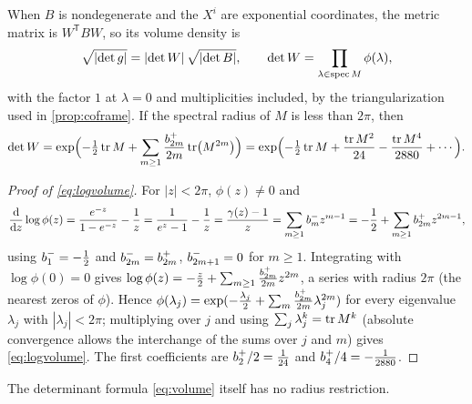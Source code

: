 When $B$ is nondegenerate and the $X^i$ are exponential coordinates, the
metric matrix is $W^{\mathsf T}BW$, so its volume density is
\begin{equation}\label{eq:volume}
 \sqrt{\left\lvert\det g\right\rvert}=\left\lvert\det W\right\rvert\sqrt{\left\lvert\det B\right\rvert},\qquad
 \det W=\prod_{\lambda\in\operatorname{spec} M}\phi(\lambda),
\end{equation}
with the factor $1$ at $\lambda=0$ and multiplicities included, by the
triangularization used in \cref{prop:coframe}. If the spectral radius of
$M$ is less than $2\pi$, then
\begin{equation}\label{eq:logvolume}
 \det W=\exp\Bigl(-\tfrac12\operatorname{tr} M+\sum_{m\geq1}\frac{b^{+}_{2m}}{2m}\operatorname{tr}\bigl(M^{2m}\bigr)\Bigr)
 =\exp\Bigl(-\tfrac12\operatorname{tr} M+\frac{\operatorname{tr} M^2}{24}-\frac{\operatorname{tr} M^4}{2880}+\cdots\Bigr).
\end{equation}
\begin{proof}[Proof of \eqref{eq:logvolume}]
For $|z|<2\pi$, $\phi(z)\neq0$ and
\[
 \frac{\mathrm{d}}{\mathrm{d} z}\log\phi(z)=\frac{e^{-z}}{1-e^{-z}}-\frac1z
 =\frac1{e^z-1}-\frac1z=\frac{\gamma(z)-1}{z}
 =\sum_{m\geq1}b^{-}_{m}z^{m-1}=-\frac12+\sum_{m\geq1}b^{+}_{2m}z^{2m-1},
\]
using $b^{-}_{1}=-\tfrac12$ and $b^{-}_{2m}=b^{+}_{2m}$, $b^{-}_{2m+1}=0$
for $m\geq1$. Integrating with $\log\phi(0)=0$ gives
$\log\phi(z)=-\tfrac z2+\sum_{m\geq1}\tfrac{b^{+}_{2m}}{2m}z^{2m}$, a
series with radius $2\pi$ (the nearest zeros of $\phi$). Hence
$\phi(\lambda_j)=\exp(-\tfrac{\lambda_j}2+\sum_m\tfrac{b^{+}_{2m}}{2m}\lambda_j^{2m})$
for every eigenvalue $\lambda_j$ with $|\lambda_j|<2\pi$; multiplying over
$j$ and using $\sum_j\lambda_j^{k}=\operatorname{tr} M^k$ (absolute convergence allows
the interchange of the sums over $j$ and $m$) gives \eqref{eq:logvolume}.
The first coefficients are $b^{+}_{2}/2=\tfrac1{24}$ and
$b^{+}_{4}/4=-\tfrac1{2880}$.
\end{proof}
The determinant formula \eqref{eq:volume} itself has no radius restriction.

